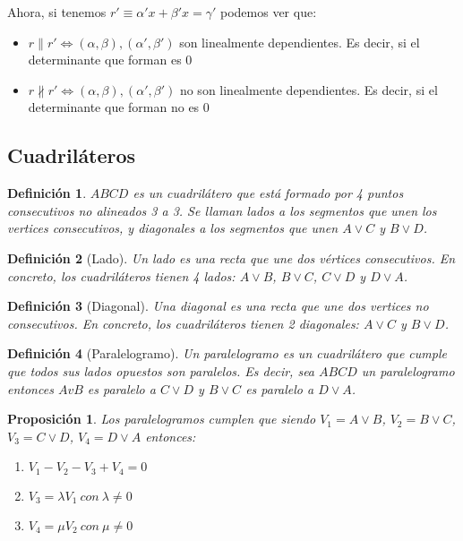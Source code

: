 \documentclass[11pt, a4paper, titlepage]{article}
\theoremstyle{theorem-style}
\newtheorem{nprop}{Proposición}[section]
\theoremstyle{definition-style}
\newtheorem{ndef}{Definición}[section]
\theoremstyle{remark-style}
\theoremstyle{example-style}
\newenvironment{nlist}
{\begin{enumerate}
    \renewcommand\labelenumi{(\emph{\roman{enumi})}}}
  {\end{enumerate}}
\begin{document}
Ahora, si tenemos $r'\equiv \alpha' x + \beta' x = \gamma '$ podemos ver que:
\begin{itemize}
\item $r \parallel r' \iff (\alpha,\beta), (\alpha',\beta') $ son linealmente dependientes. Es decir, si el determinante que forman es $0$

\item $r \nparallel r'\iff (\alpha,\beta), (\alpha',\beta') $ no son linealmente dependientes. Es decir, si el determinante que forman no es $0$
\end{itemize}

\subsection{Cuadriláteros}

\begin{ndef}
  $ABCD$ es un cuadrilátero que está formado por 4 puntos consecutivos no alineados 3 a 3. Se llaman lados a los segmentos que unen los vertices consecutivos, y diagonales a los segmentos que unen $A \vee C$ y $B \vee D$.
\end{ndef}

\begin{ndef}[Lado]
  Un lado es una recta que une dos vértices consecutivos. En concreto, los cuadriláteros tienen 4 lados: $A \vee B$, $B \vee C$, $C \vee D$
  y $D \vee A$.
\end{ndef}

\begin{ndef}[Diagonal]
  Una diagonal es una recta que une dos vertices no consecutivos. En concreto, los cuadriláteros tienen 2 diagonales: $A \vee C$ y $B \vee D$.
\end{ndef}

\begin{ndef}[Paralelogramo]
  Un paralelogramo es un cuadrilátero que cumple que todos sus lados opuestos son paralelos. Es decir, sea $ABCD$ un
  paralelogramo entonces $AvB$ es paralelo a $C \vee D$ y $B \vee C$ es paralelo a $D \vee A$.
  

\end{ndef}
\hfill
\begin{nprop}
	Los paralelogramos cumplen que
  siendo $V_{1} = A \vee B$, $V_{2} = B \vee C$, $V_{3} = C\vee D$, $V_{4} = D \vee A$ entonces:
  \begin{nlist}
  \item $V_{1} - V_{2} - V_{3} + V_{4} = 0$
  \item $V_{3} = \lambda V_{1}\ con\ \lambda \neq 0$
  \item $V_{4} = \mu V_{2}\ con\ \mu \neq 0$
  \end{nlist}
\end{nprop}
\end{document}
